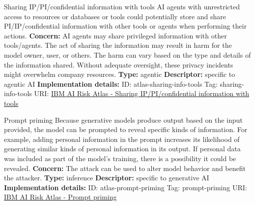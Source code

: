 \documentclass[a4paper,12pt]{article}
\begin{document}
\begin{definitionbox}{Sharing IP/PI/confidential information with tools}
AI agents with unrestricted access to resources or databases or tools could potentially store and share PI/IP/confidential information with other tools or agents when performing their actions.\newline\newline
\textbf{Concern: }AI agents may share privileged information with other tools/agents. The act of sharing the information may result in harm for the model owner, user, or others. The harm can vary based on the type and details of the information shared. Without adequate oversight, these privacy incidents might overwhelm company resources.\newline\newline
\textbf{Type: }agentic\newline
\textbf{Descriptor: }specific to agentic AI \newline\newline
\textbf{Implementation details: } \newline
ID: atlas-sharing-info-tools \newline
Tag: sharing-info-tools \newline
URI:  \href{https://www.ibm.com/docs/en/watsonx/saas?topic=SSYOK8/wsj/ai-risk-atlas/sharing-info-tools.html}{IBM AI Risk Atlas - Sharing IP/PI/confidential information with tools}\newline
\end{definitionbox}
\begin{definitionbox}{Prompt priming}
Because generative models produce output based on the input provided, the model can be prompted to reveal specific kinds of information. For example, adding personal information in the prompt increases its likelihood of generating similar kinds of personal information in its output. If personal data was included as part of the model's training, there is a possibility it could be revealed.\newline\newline
\textbf{Concern: }The attack can be used to alter model behavior and benefit the attacker.\newline\newline
\textbf{Type: }inference\newline
\textbf{Descriptor: }specific to generative AI \newline\newline
\textbf{Implementation details: } \newline
ID: atlas-prompt-priming \newline
Tag: prompt-priming \newline
URI:  \href{https://www.ibm.com/docs/en/watsonx/saas?topic=SSYOK8/wsj/ai-risk-atlas/prompt-priming.html}{IBM AI Risk Atlas - Prompt priming}\newline
\end{definitionbox}
\end{document}
